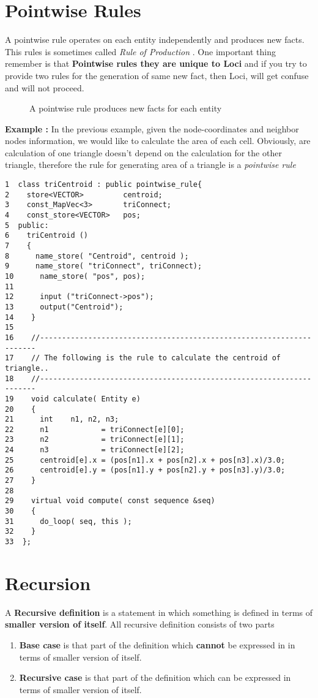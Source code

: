 \section{ Pointwise Rules }
A pointwise rule operates on each entity independently and produces new facts. This
rules is sometimes called {\em Rule of Production }.  
One important thing remember is that {\bf Pointwise rules they are unique
to Loci} and if you try to provide two rules for the generation of same new fact,
then Loci, will get confuse and will not proceed.
%
\begin{figure}[h]
\vspace{2.50in}\caption { A pointwise rule produces new facts for each entity  }
\end{figure}
%
\par {\bf Example : } In the previous example, given the node-coordinates and 
neighbor nodes information, we would like to calculate the area of each
cell. Obviously, are calculation of one triangle doesn't depend on the 
calculation for the other triangle, therefore the rule for generating
area of a triangle is a {\em pointwise rule}
\begin{verbatim}
1  class triCentroid : public pointwise_rule{
2    store<VECTOR>         centroid;
3    const_MapVec<3>       triConnect;
4    const_store<VECTOR>   pos;
5  public:
6    triCentroid ()
7    {
8      name_store( "Centroid", centroid );
9      name_store( "triConnect", triConnect);
10      name_store( "pos", pos);
11
12      input ("triConnect->pos");
13      output("Centroid");
14    }
15
16    //---------------------------------------------------------------------
17    // The following is the rule to calculate the centroid of triangle..
18    //---------------------------------------------------------------------
19    void calculate( Entity e)
20    {
21      int    n1, n2, n3;
22      n1            = triConnect[e][0];
23      n2            = triConnect[e][1];
24      n3            = triConnect[e][2];
25      centroid[e].x = (pos[n1].x + pos[n2].x + pos[n3].x)/3.0;
26      centroid[e].y = (pos[n1].y + pos[n2].y + pos[n3].y)/3.0;
27    }
28
29    virtual void compute( const sequence &seq)
30    {
31      do_loop( seq, this );
32    }
33  };
\end{verbatim}
%
\section {Recursion}
A {\bf Recursive definition} is a statement in which something is defined
in terms of {\bf smaller version of itself}. All recursive definition 
consists of two parts
\begin{enumerate}
\item {\bf Base case} is that part of the definition which {\bf cannot} 
be expressed in in terms of smaller version of itself. 
\item {\bf Recursive case} is that part of the definition which can
be expressed in terms of smaller version of itself.
\end{enumerate}

